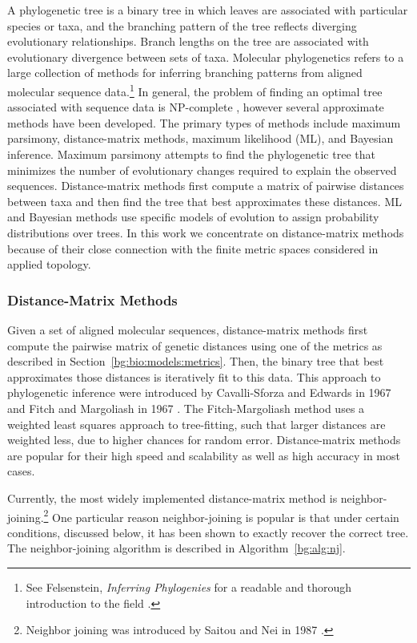 A phylogenetic tree is a binary tree in which leaves are associated with particular species or taxa, and the branching pattern of the tree reflects diverging evolutionary relationships.
Branch lengths on the tree are associated with evolutionary divergence between sets of taxa.
Molecular phylogenetics refers to a large collection of methods for inferring branching patterns from aligned molecular sequence data.\footnote{See Felsenstein, \emph{Inferring Phylogenies} for a readable and thorough introduction to the field \cite{Felsenstein:2004ws}.}
In general, the problem of finding an optimal tree associated with sequence data is NP-complete \cite{Foulds:1982fn}, however several approximate methods have been developed.
The primary types of methods include maximum parsimony, distance-matrix methods, maximum likelihood (ML), and Bayesian inference.
Maximum parsimony attempts to find the phylogenetic tree that minimizes the number of evolutionary changes required to explain the observed sequences.
Distance-matrix methods first compute a matrix of pairwise distances between taxa and then find the tree that best approximates these distances.
ML and Bayesian methods use specific models of evolution to assign probability distributions over trees.
In this work we concentrate on distance-matrix methods because of their close connection with the finite metric spaces considered in applied topology.

\subsubsection{Distance-Matrix Methods}
\label{bg:bio:phylo:distance}

Given a set of aligned molecular sequences, distance-matrix methods first compute the pairwise matrix of genetic distances using one of the metrics as described in Section~\ref{bg:bio:models:metrics}.
Then, the binary tree that best approximates those distances is iteratively fit to this data.
This approach to phylogenetic inference were introduced by Cavalli-Sforza and Edwards in 1967 \cite{CavalliSforza:1967th} and Fitch and Margoliash in 1967 \cite{Fitch:1967we}.
The Fitch-Margoliash method uses a weighted least squares approach to tree-fitting, such that larger distances are weighted less, due to higher chances for random error.
Distance-matrix methods are popular for their high speed and scalability as well as high accuracy in most cases.

Currently, the most widely implemented distance-matrix method is neighbor-joining.\footnote{Neighbor joining was introduced by Saitou and Nei in 1987 \cite{Saitou:1987wo}.}
One particular reason neighbor-joining is popular is that under certain conditions, discussed below, it has been shown to exactly recover the correct tree.
The neighbor-joining algorithm is described in Algorithm~\ref{bg:alg:nj}.

